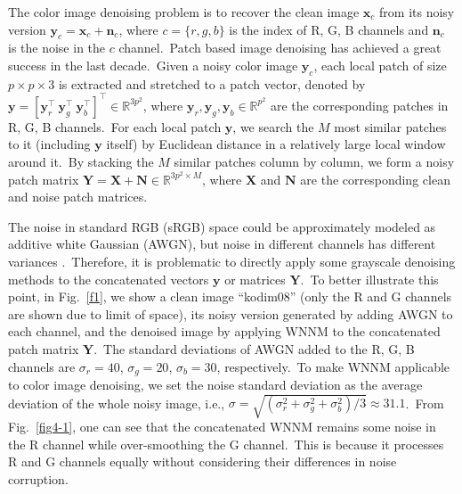 The color image denoising problem is to recover the clean image $\mathbf{x}_{c}$ from its noisy version $\mathbf{y}_{c}=\mathbf{x}_{c}+\mathbf{n}_{c}$, where $c=\{r, g, b\}$ is the index of R, G, B channels and $\mathbf{n}_{c}$ is the noise in the $c$ channel.\ Patch based image denoising \cite{foe,ksvd,bm3d,lssc,epll,ncsr,mlp,csf,wnnm,pgpd,tnrd,dncnn} has achieved a great success in the last decade.\ Given a noisy color image $\mathbf{y}_{c}$, each local patch of size $p\times p \times 3$ is extracted and stretched to a patch vector, denoted by $\mathbf{y}=[\mathbf{y}_{r}^{\top}\ \mathbf{y}_{g}^{\top}\ \mathbf{y}_{b}^{\top}]^{\top}\in\mathbb{R}^{3p^{2}}$, where $\mathbf{y}_{r}, \mathbf{y}_{g}, \mathbf{y}_{b}\in\mathbb{R}^{p^{2}}$ are the corresponding patches in R, G, B channels.\ For each local patch $\mathbf{y}$, we search the $M$ most similar patches to it (including $\mathbf{y}$ itself) by Euclidean distance in a relatively large local window around it.\ By stacking the $M$ similar patches column by column, we form a noisy patch matrix $\mathbf{Y}=\mathbf{X}+\mathbf{N}\in\mathbb{R}^{3p^{2}\times M}$, where $\mathbf{X}$ and $\mathbf{N}$ are the corresponding clean and noise patch matrices.

The noise in standard RGB (sRGB) space could be approximately modeled as additive white Gaussian (AWGN), but noise in different channels has different variances \cite{Liu2008,Leungtip,crosschannel2016}.\ Therefore, it is problematic to directly apply some grayscale denoising methods to the concatenated vectors $\mathbf{y}$ or matrices $\mathbf{Y}$.\ To better illustrate this point, in Fig.\ \ref{f1}, we show a clean image ``kodim08'' (only the R and G channels are shown due to limit of space), its noisy version generated by adding AWGN to each channel, and the denoised image by applying WNNM \cite{wnnmijcv} to the concatenated  patch matrix $\mathbf{Y}$.\ The standard deviations of AWGN added to the R, G, B channels are $\sigma_{r}=40$, $\sigma_{g}=20$, $\sigma_{b}=30$, respectively.\ To make WNNM applicable to color image denoising, we set the noise standard deviation as the average deviation of the whole noisy image, i.e., $\sigma=\sqrt{(\sigma_{r}^{2}+\sigma_{g}^{2}+\sigma_{b}^{2})/3}\approx31.1$.\ From Fig.\ \ref{fig4-1}, one can see that the concatenated WNNM remains some noise in the R channel while over-smoothing the G channel.\ This is because it processes R and G channels equally without considering their differences in noise corruption.


